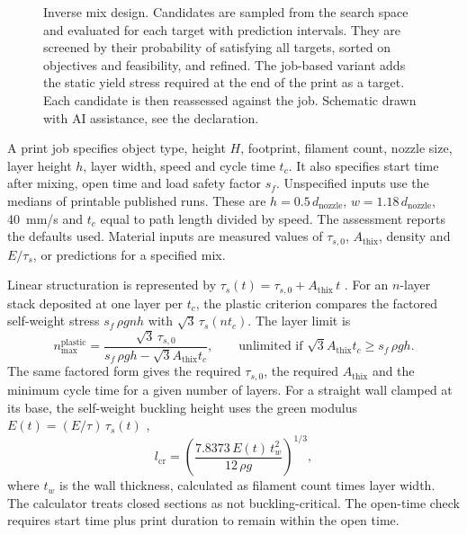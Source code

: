 \documentclass[preprint,12pt]{elsarticle}
\newcommand{\aidisclosure}{Schematic drawn with AI assistance, see the declaration.}
\begin{document}
\begin{figure}[t]
\centering
\resizebox{\textwidth}{!}{}
\caption{Inverse mix design. Candidates are sampled from the search space and evaluated for each target with prediction intervals. They are screened by their probability of satisfying all targets, sorted on objectives and feasibility, and refined. The job-based variant adds the static yield stress required at the end of the print as a target. Each candidate is then reassessed against the job. \aidisclosure}
\label{fig:inverse}
\end{figure}

A print job specifies object type, height $H$, footprint, filament count, nozzle size, layer height $h$, layer width, speed and cycle time $t_c$. It also specifies start time after mixing, open time and load safety factor $s_f$. Unspecified inputs use the medians of printable published runs. These are $h = 0.5\,d_{\mathrm{nozzle}}$, $w = 1.18\,d_{\mathrm{nozzle}}$, 40~mm/s and $t_c$ equal to path length divided by speed. The assessment reports the defaults used. Material inputs are measured values of $\tau_{s,0}$, $A_{\mathrm{thix}}$, density and $E/\tau_s$, or predictions for a specified mix.

Linear structuration is represented by $\tau_s(t) = \tau_{s,0} + A_{\mathrm{thix}}\, t$ \cite{perrot2016structural,roussel2018rheological}. For an $n$-layer stack deposited at one layer per $t_c$, the plastic criterion compares the factored self-weight stress $s_f\,\rho g n h$ with $\sqrt{3}\,\tau_s(n t_c)$. The layer limit is
\begin{equation}
n_{\max}^{\mathrm{plastic}} = \frac{\sqrt{3}\,\tau_{s,0}}{s_f\,\rho g h - \sqrt{3} A_{\mathrm{thix}} t_c},
\qquad \text{unlimited if } \sqrt{3} A_{\mathrm{thix}} t_c \ge s_f\,\rho g h .
\label{eq:plastic}
\end{equation}
The same factored form gives the required $\tau_{s,0}$, the required $A_{\mathrm{thix}}$ and the minimum cycle time for a given number of layers.
For a straight wall clamped at its base, the self-weight buckling height uses the green modulus $E(t) = (E/\tau)\,\tau_s(t)$ \cite{suiker2018mechanical},
\begin{equation}
l_{\mathrm{cr}} = \left( \frac{7.8373\, E(t)\, t_w^2}{12\, \rho g} \right)^{1/3},
\label{eq:buckling}
\end{equation}
where $t_w$ is the wall thickness, calculated as filament count times layer width. The calculator treats closed sections as not buckling-critical. The open-time check requires start time plus print duration to remain within the open time.
\end{document}
